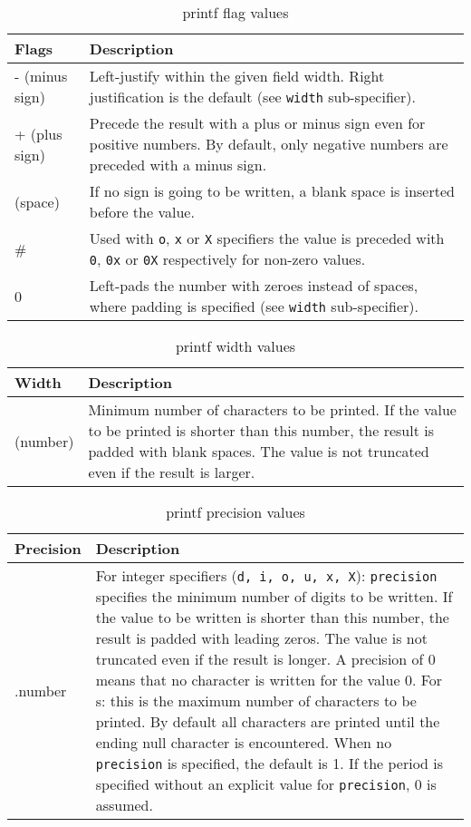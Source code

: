 \documentclass[twoside,english]{article}
\providecommand{\tabularnewline}{\\}
\begin{document}
\begin{table}[H]
\caption{printf flag values}
\begin{tabular}{|>{\raggedright}p{1.5in}|>{\raggedright}p{4.5in}|}
\hline
\textbf{Flags}&
\textbf{Description}\tabularnewline
\hline
\hline
- (minus sign)&
Left-justify within the given field width. Right justification is the default
(see \texttt{width} sub-specifier).\tabularnewline
\hline 
+ (plus sign)&
Precede the result with a plus or minus sign even for positive numbers. By
default, only negative numbers are preceded with a minus sign.\tabularnewline
\hline 
(space)&
If no sign is going to be written, a blank space is inserted before the value.\tabularnewline
\hline 
\#&
Used with \texttt{o}, \texttt{x} or \texttt{X} specifiers the value is preceded
with \texttt{0}, \texttt{0x} or \texttt{0X} respectively for non-zero values.\tabularnewline
\hline 
0&
Left-pads the number with zeroes instead of spaces, where padding is specified
(see \texttt{width} sub-specifier).\tabularnewline
\hline
\end{tabular}
\end{table}

\begin{table}[H]
\caption{printf width values}
\begin{tabular}{|>{\raggedright}p{1.5in}|>{\raggedright}p{4.5in}|}
\hline
\textbf{Width}&
\textbf{Description}\tabularnewline
\hline
\hline
(number)&
Minimum number of characters to be printed. If the value to be printed is
shorter than this number, the result is padded with blank spaces. The value
is not truncated even if the result is larger.\tabularnewline
\hline
\end{tabular}
\end{table}

%
\begin{table}[H]

\caption{printf precision values}

\begin{tabular}{|>{\raggedright}p{1.5in}|>{\raggedright}p{4.5in}|}
\hline 
\textbf{Precision}&
\textbf{Description}\tabularnewline
\hline
\hline 
.number&
For integer specifiers (\texttt{d, i, o, u, x, X}): \texttt{precision} specifies
the minimum number of digits to be written. If the value to be written is
shorter than this number, the result is padded with leading zeros. The value
is not truncated even if the result is longer. A precision of 0 means that
no character is written for the value 0. For s: this is the maximum number
of characters to be printed. By default all characters are printed until
the ending null character is encountered. When no \texttt{precision} is specified,
the default is 1. If the period is specified without an explicit value for
\texttt{precision}, 0 is assumed.\tabularnewline
\hline
\end{tabular}
\end{table}
\end{document}

